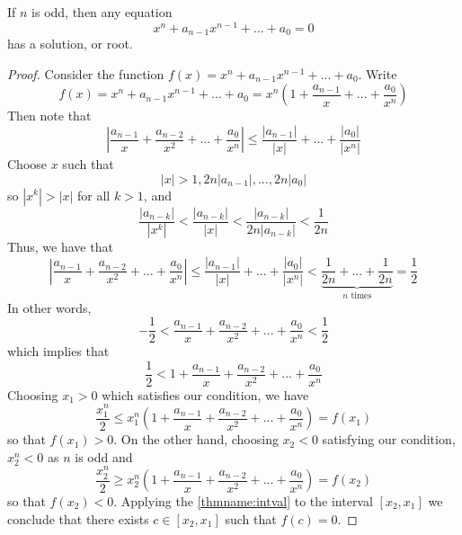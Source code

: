 \documentclass[12pt, a4paper, oneside, openright, titlepage]{book}
\begin{document}
\begin{cor}
    If $n$ is odd, then any equation \begin{equation}
        x^n + a_{n-1}x^{n-1} + ... + a_0 = 0
    \end{equation}
    has a solution, or root.
\end{cor}
\begin{proof}
    Consider the function $f(x) = x^n+a_{n-1}x^{n-1} + ... + a_0$. Write $$f(x) = x^n+a_{n-1}x^{n-1} + ... + a_0 = x^n\left(1 + \frac{a_{n-1}}{x} + ... + \frac{a_0}{x^n}\right)$$ 
    Then note that $$\left|\frac{a_{n-1}}{x} + \frac{a_{n-2}}{x^2} + ... + \frac{a_0}{x^n}\right|\leq \frac{|a_{n-1}|}{|x|} + ... + \frac{|a_0|}{|x^n|}$$
    Choose $x$ such that $$|x| > 1,2n|a_{n-1}|,...,2n|a_0|$$
    so $|x^k| > |x|$ for all $k > 1$, and $$\frac{|a_{n-k}|}{|x^k|} < \frac{|a_{n-k}|}{|x|} < \frac{|a_{n-k}|}{2n|a_{n-k}|} < \frac{1}{2n}$$
    Thus, we have that $$\left|\frac{a_{n-1}}{x} + \frac{a_{n-2}}{x^2} + ... + \frac{a_0}{x^n}\right|\leq \frac{|a_{n-1}|}{|x|} + ... + \frac{|a_0|}{|x^n|} < \underbrace{\frac{1}{2n} + ... +\frac{1}{2n}}_{\text{$n$ times}} = \frac{1}{2}$$
    In other words, $$-\frac{1}{2} < \frac{a_{n-1}}{x} + \frac{a_{n-2}}{x^2} + ... + \frac{a_0}{x^n} < \frac{1}{2}$$
    which implies that $$\frac{1}{2} < 1 + \frac{a_{n-1}}{x} + \frac{a_{n-2}}{x^2} + ... + \frac{a_0}{x^n}$$
    Choosing $x_1 > 0$ which satisfies our condition, we have $$\frac{x_1^n}{2} \leq x_1^n\left(1+\frac{a_{n-1}}{x} + \frac{a_{n-2}}{x^2} + ... + \frac{a_0}{x^n}\right) = f(x_1)$$
    so that $f(x_1) > 0$. On the other hand, choosing $x_2 < 0$ satisfying our condition, $x_2^n < 0$ as $n$ is odd and $$\frac{x_2^n}{2} \geq x_2^n\left(1+\frac{a_{n-1}}{x} + \frac{a_{n-2}}{x^2} + ... + \frac{a_0}{x^n}\right) = f(x_2)$$
    so that $f(x_2) < 0$. Applying the \ref{thmname:intval} to the interval $[x_2,x_1]$ we conclude that there exists $c \in [x_2,x_1]$ such that $f(c) = 0$.
\end{proof}
\end{document}
